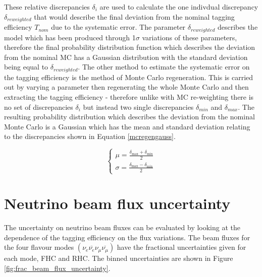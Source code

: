 These relative discrepancies $\delta_{i}$ are used to calculate the one indivdual discrepancy $\delta_{reweighted}$ that would describe the final deviation from the nominal tagging efficiency $T_{nom}$ due to the systematic error. The parameter $\delta_{reweighted}$ describes the model which has been produced through 1$\sigma$ variations of these parameters, therefore the final probability distribution function which describes the deviation from the nominal MC has a Gaussian distribution with the standard deviation being equal to $\delta_{reweighted}$. 
\newline
The other method to estimate the systematic error on the tagging efficiency is the method of Monte Carlo regeneration. This is carried out by varying a parameter then regenerating the whole Monte Carlo and then extracting the tagging efficiency - therefore unlike with MC re-weighting there is no set of discrepancies $\delta_{i}$ but instead two single discrepancies $\delta_{min}$ and $\delta_{max}$. The resulting probability distribution which describes the deviation from the nominal Monte Carlo is a Gaussian which has the mean and standard deviation relating to the discrepancies shown in Equation \eqref{mcregengauss}.
\newline

\begin{equation}
\left\{\begin{array}{l}
\mu=\frac{\delta_{\max }+\delta_{\min }}{2} \\
\sigma=\frac{\delta_{\max }-\delta_{\min }}{2}
\end{array}\right.
\label{mcregengauss}
\end{equation}


\section{Neutrino beam flux uncertainty}

The uncertainty on neutrino beam fluxes can be evaluated by looking at the dependence of the tagging efficiency on the flux variations. The beam fluxes for the four flavour modes 
$\left(\nu_{e} \overline{\nu_{e}} \nu_{\mu} \overline{\nu_{\mu}}\right)$ have the fractional uncertainties given for each mode, FHC and RHC. The binned uncertainties are shown in Figure \ref{fig:frac_beam_flux_uncertainty}.



